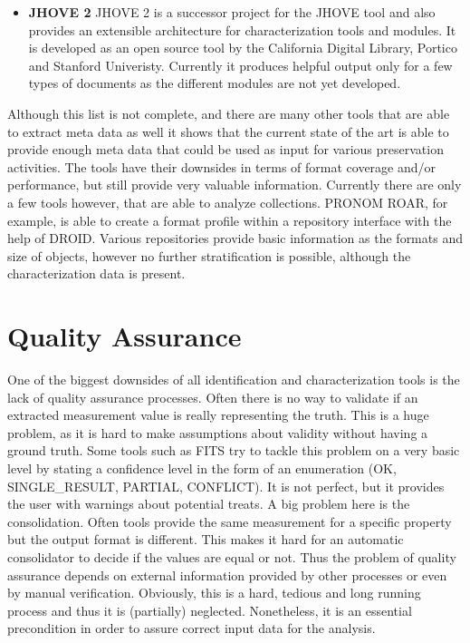 \begin{itemize}
\item \textbf{JHOVE 2}\newline
JHOVE 2 is a successor project for the JHOVE tool and also provides an extensible architecture for characterization tools and modules. It is developed as an open source tool by the California Digital Library, Portico and Stanford Univeristy. Currently it produces helpful output only for a few types of documents as the different modules are not yet developed.

\end{itemize}

Although this list is not complete, and there are many other tools that are able to extract meta data as well it shows that the current state of the art is able to provide enough meta data that could be used as input for various preservation activities. The tools have their downsides in terms of format coverage and/or performance, but still provide very valuable information.
Currently there are only a few tools however, that are able to analyze collections. PRONOM ROAR, for example, is able to create a format profile within a repository interface with the help of DROID.
Various repositories provide basic information as the formats and size of objects, however no further stratification is possible, although the characterization data is present.



\section{Quality Assurance}
One of the biggest downsides of all identification and characterization tools is the lack of quality assurance processes. Often there is no way to validate if an extracted measurement value is really representing the truth. This is a huge problem, as it is hard to make assumptions about validity without having a ground truth.
Some tools such as FITS try to tackle this problem on a very basic level by stating a confidence level in the form of an enumeration (OK, SINGLE\_RESULT, PARTIAL, CONFLICT). It is not perfect, but it provides the user with warnings about potential treats.
A big problem here is the consolidation. Often tools provide the same measurement for a specific property but the output format is different. This makes it hard for an automatic consolidator to decide if the values are equal or not. Thus the problem of quality assurance depends on external information provided by other processes or even by manual verification. 
Obviously, this is a hard, tedious and long running process and thus it is (partially) neglected.
Nonetheless, it is an essential precondition in order to assure correct input data for the analysis.

